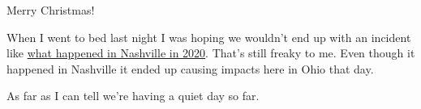 Merry Christmas!

When I went to bed last night I was hoping we wouldn't end up with an
incident like
\href{https://simple.wikipedia.org/w/index.php?title=2020_Nashville_bombing&oldid=8516117}{what
happened in Nashville in 2020}. That's still freaky to me. Even though
it happened in Nashville it ended up causing impacts here in Ohio that
day.

As far as I can tell we're having a quiet day so far.
